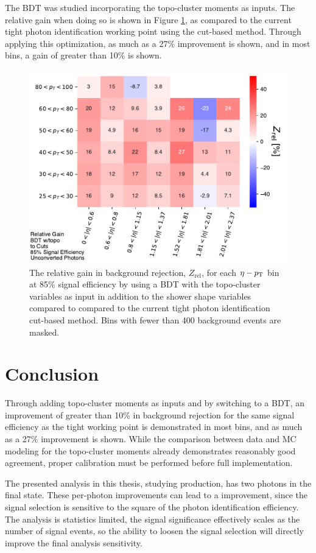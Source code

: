 The \gls{BDT} was studied incorporating the topo-cluster moments as inputs. The relative gain when doing so is shown in Figure \ref{fig:bdt-topo-vs-cuts}, as compared to the current tight photon identification working point using the cut-based method. Through applying this optimization, as much as a 27\% improvement is shown, and in most \etaPt bins, a gain of greater than 10\% is shown.
\begin{figure}[!htb]
    \centering
    \includegraphics[width=.85\textwidth]{chapters/chapter4_photonID/images/BDTtopo_v_cuts_normed.pdf}
    \caption[The relative gain in background rejection by using a \gls{BDT} with topo-cluster variables compared to the current tight photon identification methods]
    {The relative gain in background rejection, $Z_{\text{rel}}$, for each $\eta-p_{\text{T}}$ bin at 85\% signal efficiency by using a \gls{BDT} with the topo-cluster variables as input in addition to the shower shape variables compared to compared to the current tight photon identification cut-based method. Bins with fewer than 400 background events are masked.}
    \label{fig:bdt-topo-vs-cuts}
\end{figure}

\section{Conclusion}

Through adding topo-cluster moments as inputs and by switching to a \gls{BDT}, an improvement of greater than 10\% in background rejection for the same signal efficiency as the tight working point is demonstrated in most \etaPt bins, and as much as a 27\% improvement is shown. While the comparison between data and \gls{MC} modeling for the topo-cluster moments already demonstrates reasonably good agreement, proper calibration must be performed before full implementation. 

The presented analysis in this thesis, studying \hhyybb production, has two photons in the final state. These per-photon improvements can lead to a improvement, since the signal selection is sensitive to the square of the photon identification efficiency. The analysis is statistics limited, the signal significance effectively scales as the number of signal events, so the ability to loosen the signal selection will directly improve the final analysis sensitivity.